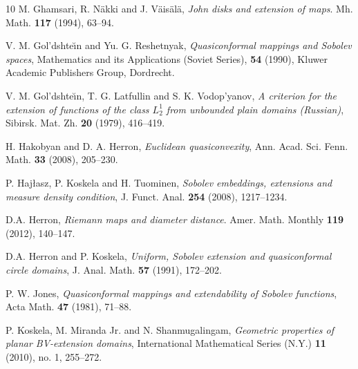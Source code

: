 \documentclass[reqno,11pt]{amsart}
\numberwithin{equation}{section}
\theoremstyle{remark}
\begin{document}
\begin{thebibliography}{10}
 M. Ghamsari, R. N\"akki and J. V\"ais\"al\"a,
\emph{John disks and extension of maps}. Mh. Math. \textbf{117} (1994),
63--94.



 V. M. Gol'dshte{\u\i}n and Yu. G. Reshetnyak,
 \emph{Quasiconformal mappings and {S}obolev spaces}, 
 Mathematics and its Applications (Soviet Series),
 \textbf{54} (1990), Kluwer Academic Publishers Group, Dordrecht.
 
 
 V. M. Gol'dshte{\u\i}n, T. G. Latfullin and S. K. Vodop'yanov,
 \emph{A criterion for the extension of functions of the class $L_2^1$ from unbounded plain domains 
(Russian)},
 Sibirsk. Mat. Zh. \textbf{20} (1979), 416--419.
 
 H. Hakobyan and D. A. Herron, \emph{Euclidean quasiconvexity}, Ann. Acad. Sci.
 Fenn. Math. \textbf{33} (2008), 205--230.

 P. Haj{\l}asz, P. Koskela and H. Tuominen,
\emph{Sobolev embeddings, extensions and measure density condition},
J. Funct. Anal. \textbf{254} (2008), 1217--1234.


 

 D.A. Herron, \emph{Riemann maps and diameter distance}. Amer.
Math. Monthly \textbf{119} (2012), 140--147. 

 D.A. Herron and P. Koskela,
\emph{Uniform, {S}obolev extension and quasiconformal circle domains},
  J. Anal. Math. \textbf{57} (1991), 172--202.



P. W. Jones, \emph{Quasiconformal mappings and extendability of Sobolev functions},
 Acta Math. \textbf{47} (1981), 71--88.


 P. Koskela, M. Miranda Jr. and N. Shanmugalingam, 
 \emph{Geometric properties of planar BV-extension domains}, 
 International Mathematical Series (N.Y.) \textbf{11} (2010), no. 1, 255--272.



\end{thebibliography}
\end{document}
